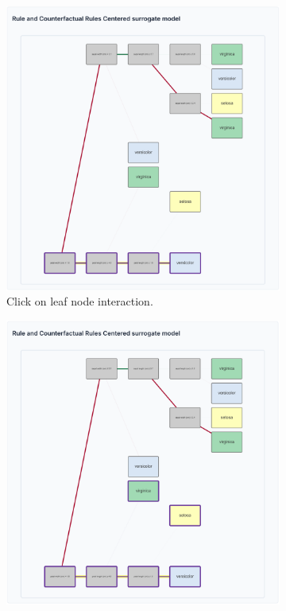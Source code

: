 \begin{figure}
    \centering
    \begin{subfigure}[c]{0.48\textwidth}
        \centering
        \includegraphics[width=\linewidth]{images/blocksDecisionTreeFinalLeafInteraction.png}
        \caption{Click on leaf node interaction.}
        \label{fig:blocksDecisionTreeFinalLeafClick}
    \end{subfigure}
    \vspace{0.3cm}
    \begin{subfigure}[c]{0.48\linewidth}
        \centering
        \includegraphics[width=\linewidth]{images/blocksDecisionTreeFinalSplitInteraction.png}

\end{subfigure}
\end{figure}
